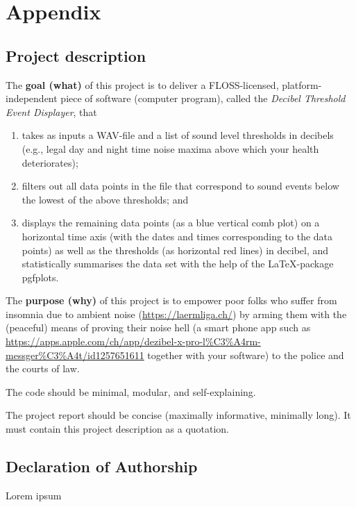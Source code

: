 \section{Appendix}

\subsection{Project description}

The \textbf{goal (what)} of this project is to deliver a FLOSS-licensed, platform-independent piece of
software (computer program), called the \textit{Decibel Threshold Event Displayer}, that

\begin{enumerate}
    \item takes as inputs a WAV-file and a list of sound level thresholds in decibels (e.g., legal day
    and night time noise maxima above which your health deteriorates);
    \item filters out all data points in the file that correspond to sound events below the lowest of
    the above thresholds; and
    \item displays the remaining data points (as a blue vertical comb plot) on a horizontal time
    axis (with the dates and times corresponding to the data points) as well as the
    thresholds (as horizontal red lines) in decibel, and statistically summarises the data set
    with the help of the LaTeX-package pgfplots.
\end{enumerate}

The \textbf{purpose (why)} of this project is to empower poor folks who suffer from insomnia due to
ambient noise (\url{https://laermliga.ch/}) by arming them with the (peaceful) means of proving
their noise hell (a smart phone app such as \url{https://apps.apple.com/ch/app/dezibel-x-pro-l%C3%A4rm-messger%C3%A4t/id1257651611}
together with your software) to the police and the courts of law. \newline

The code should be minimal, modular, and self-explaining. \newline

The project report should be concise (maximally informative, minimally long). It must contain
this project description as a quotation.

\subsection{Declaration of Authorship}
Lorem ipsum